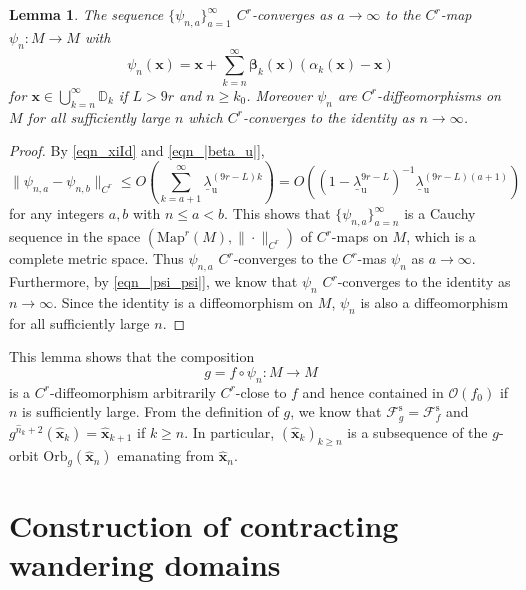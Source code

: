 \documentclass{amsart}
\newtheorem{lem}[thm]{Lemma}
\theoremstyle{definition}
\numberwithin{equation}{section}
\numberwithin{figure}{section}
\begin{document}
\begin{lem}\label{l_psi_n}
The sequence $\{\psi_{n,a}\}_{a=1}^\infty$ $C^r$-converges as $a\rightarrow \infty$ to the $C^r$-map 
$\psi_n:M\longrightarrow M$ with 
$$\psi_n(\boldsymbol{x})=\boldsymbol{x}+\sum_{k=n}^\infty\boldsymbol{\beta}_k(\boldsymbol{x})(\alpha_k(\boldsymbol{x})-\boldsymbol{x})$$
for $\boldsymbol{x}\in \bigcup_{k=n}^\infty \mathbb{D}_k$ 
if $L>9r$ and $n\geq k_0$.
Moreover $\psi_n$ are $C^r$-diffeomorphisms on $M$ for all sufficiently large $n$ which $C^r$-converges to 
the identity as $n\rightarrow \infty$.
\end{lem}
\begin{proof}
By \eqref{eqn_xiId} and \eqref{eqn_|beta_u|},
\begin{equation}\label{eqn_|psi_psi|}
\|\psi_{n,a}-\psi_{n,b}\|_{C^r}\leq 
O\left(\sum_{k=a+1}^\infty\underline{\lambda}_{\mathrm{u}}^{(9r-L)k}\right)
=O\left((1-\underline{\lambda}_{\mathrm{u}}^{9r-L})^{-1}\underline{\lambda}_{\mathrm{u}}^{(9r-L)(a+1)}\right)
\end{equation}
for any integers $a,b$ with $n\leq a<b$.
This shows that $\{\psi_{n,a}\}_{a=n}^\infty$ is a Cauchy sequence in the space $(\mathrm{Map}^r(M),\|\cdot\|_{C^r})$ 
of $C^r$-maps on $M$, which is a complete metric space.
Thus $\psi_{n,a}$ $C^r$-converges to the $C^r$-mas $\psi_n$ as $a\rightarrow \infty$.
Furthermore, by \eqref{eqn_|psi_psi|}, we know that $\psi_{n}$ $C^r$-converges to the identity as $n\rightarrow\infty$.
Since the identity is a diffeomorphism on $M$, $\psi_n$ is also a diffeomorphism for all sufficiently large $n$.
\end{proof}

This lemma shows that the composition 
\begin{equation}\label{eqn_gfpsi}
g=f\circ \psi_n:M\longrightarrow M
\end{equation}
is a $C^r$-diffeomorphism arbitrarily $C^r$-close to $f$ and hence contained 
in $\mathcal{O}(f_0)$ if $n$ is sufficiently large. 
From the definition of $g$, we know that $\mathcal{F}_g^{\mathrm{s}}=\mathcal{F}_f^{\mathrm{s}}$ and $g^{{\widehat n}_k+2}(\widehat{ \boldsymbol{x}}_k)=\widehat{\boldsymbol{x}}_{k+1}$ if $k\geq n$.
In particular, $(\widehat{\boldsymbol{x}}_k)_{k\geq n}$ is a subsequence of the $g$-orbit $\mathrm{Orb}_g(\widehat{\boldsymbol{x}}_n)$ emanating from $\widehat{\boldsymbol{x}}_n$.
 



\section{Construction of contracting wandering domains}\label{S_CWD}
\end{document}
